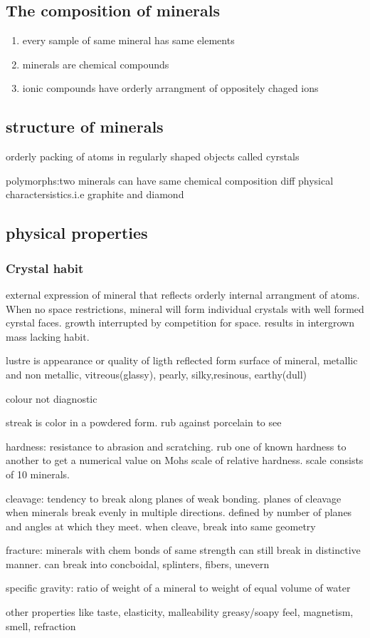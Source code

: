 \documentclass[11pt]{amsart}
\begin{document}
  \subsection{The composition of minerals}
  \begin{enumerate}
    \item every sample of same mineral has same elements
    \item minerals are chemical compounds
    \item ionic compounds have orderly arrangment of oppositely chaged ions
  \end{enumerate}
  \subsection{structure of minerals}
  \begin{enum}
  \item orderly packing of atoms in regularly shaped objects called
    cyrstals
  \item polymorphs:two minerals can have same chemical composition diff physical
    charactersistics.i.e graphite and diamond
  \end{enum}
  \subsection{physical properties}
  \subsubsection{Crystal habit}
  \par external expression of mineral that reflects orderly internal
  arrangment of atoms. When no space restrictions, mineral will form
  individual crystals with well formed cyrstal faces. growth interrupted by
  competition for space. results in intergrown mass lacking habit.
  \par lustre is appearance or quality of ligth reflected form surface of
  mineral, metallic and non metallic, vitreous(glassy), pearly,
  silky,resinous, earthy(dull)
  \par colour not diagnostic
  \par streak is color in a powdered form. rub against porcelain to see
  \par hardness: resistance to abrasion and scratching. rub one of known
  hardness to another to get a numerical value on Mohs scale of relative
  hardness. scale consists of 10 minerals.

  \par cleavage: tendency to break along planes of weak bonding. planes of
  cleavage when minerals break evenly in multiple directions. defined by
  number of planes and angles at which they meet. when cleave, break into
  same geometry
  \par fracture: minerals with chem bonds of same strength can still
  break in distinctive manner. can break into concboidal, splinters,
  fibers, unevern
  \par specific gravity: ratio of weight of a mineral to weight of equal
  volume of water
  \par other properties like taste, elasticity, malleability greasy/soapy
  feel, magnetism, smell, refraction
\end{document}
